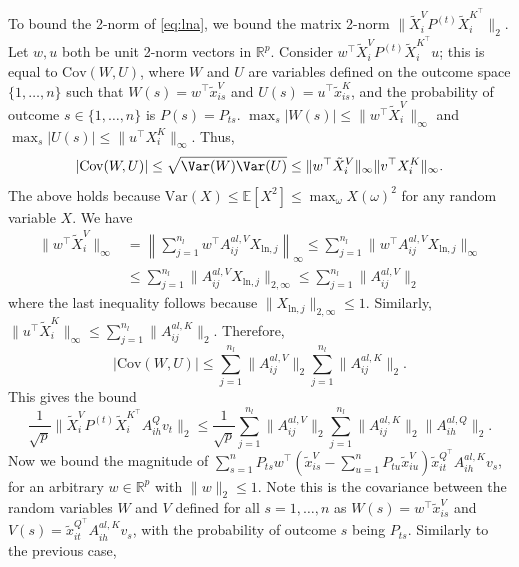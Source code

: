 \documentclass{article}
\begin{document}
To bound the 2-norm of \eqref{eq:lna}, we bound the matrix 2-norm $\|\tilde X_i^V P^{(t)} \tilde X_i^{K^\top}\|_2$. Let $w, u$ both be unit 2-norm
vectors in $\mathbb R^p$. Consider $w^\top \tilde X_i^V P^{(t)} \tilde X_i^{K^\top} u$; this is equal to $\mathrm{Cov}(W, U)$, where 
$W$ and $U$ are variables defined on the outcome space $\{1,\ldots, n\}$ such that $W(s) = w^\top \tilde x^V_{is}$ and $U(s) = 
u^\top \tilde x^{K}_{is}$, and the probability of outcome $s\in\{1,\ldots, n\}$ is $P(s) = P_{ts}$.
$\max_s |W(s)| \leq \|w^\top \tilde X_i^V\|_\infty$ and $\max_s |U(s)| \leq \|u^\top X_i^K\|_\infty$. Thus, 
\begin{equation*}
  |\mathrm{Cov}(W, U)| \leq \sqrt{\Var(W)\Var(U)} \leq \|w^\top \tilde X_i^V\|_\infty \|v^\top X_i^K\|_\infty.
\end{equation*}
The above holds because $\mathrm{Var}(X) \leq \mathbb E [X^2] \leq \max_{\omega} X(\omega)^2$ for any random variable $X$.
We have 
\begin{align*}
\|w^\top \tilde X_i^V\|_\infty &= \left\|\sum_{j=1}^{n_l} w^\top A^{al, V}_{ij} X_{\text{ln},j}\right\|_\infty
\leq \sum_{j=1}^{n_l} \|w^\top A^{al, V}_{ij} X_{\text{ln},j}\|_\infty \\
&\leq \sum_{j=1}^{n_l} \|A^{al, V}_{ij} X_{\text{ln},j}\|_{2,\infty} \leq \sum_{j=1}^{n_l} \|A_{ij}^{al, V}\|_2
\end{align*}
where the last inequality follows because $\|X_{\text{ln},j}\|_{2,\infty}\leq 1$. Similarly, $\|u^\top \tilde X_i^K\|_\infty
\leq \sum_{j=1}^{n_l} \|A^{al, K}_{ij}\|_2$. Therefore,
\begin{equation*}
  |\mathrm{Cov}(W, U)| \leq \sum_{j=1}^{n_l} \|A^{al, V}_{ij}\|_2 \sum_{j=1}^{n_l} \|A^{al, K}_{ij}\|_2.
\end{equation*}
This gives the bound
\begin{equation*}
  \frac1{\sqrt p} \|\tilde X_i^V P^{(t)} \tilde X_i^{K^\top} A_{ih}^Q v_t \|_2 \leq \frac1{\sqrt p} 
  \sum_{j=1}^{n_l} \|A^{al, V}_{ij}\|_2 \sum_{j=1}^{n_l} \|A^{al, K}_{ij}\|_2 \|A^{al, Q}_{ih}\|_2.
\end{equation*}
Now we bound the magnitude of $\sum_{s=1}^n P_{ts}w^\top(\tilde x^V_{is} - \sum_{u=1}^n P_{tu} \tilde x^V_{iu})
\tilde x_{it}^{Q^\top}A^{al, K}_{ih} v_s$, for an arbitrary $w\in\mathbb R^p$ with $\|w\|_2\leq 1$.
Note this is the covariance between the random variables $W$ and $V$ defined for all $s=1,\ldots, n$ as 
$W(s) = w^\top \tilde x^V_{is}$ and $V(s) = \tilde x_{it}^{Q^\top} A_{ih}^{al, K}v_s$, with the probability
of outcome $s$ being $P_{ts}$. Similarly to the previous case,
\end{document}
